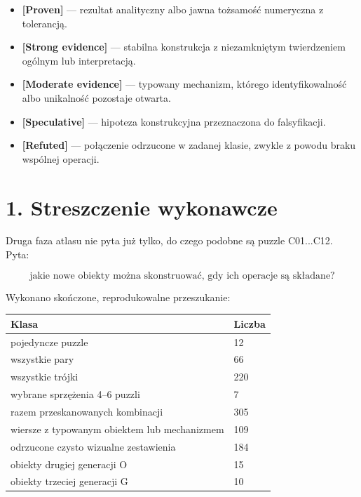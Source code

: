 \documentclass[11pt,a4paper,openany]{report}
\newcommand{\statusProven}{\textcolor{fingreen}{[Proven]}}
\newcommand{\statusStrong}{\textcolor{finblue}{[Strong evidence]}}
\newcommand{\statusModerate}{\textcolor{finviolet}{[Moderate evidence]}}
\newcommand{\statusSpeculative}{\textcolor{finorange}{[Speculative]}}
\newcommand{\statusRefuted}{\textcolor{finred}{[Refuted]}}
\begin{document}
\begin{itemize}
\item 
\textbf{\statusProven{}} --- rezultat analityczny albo jawna to\.zsamość numeryczna z tolerancją.

\item 
\textbf{\statusStrong{}} --- stabilna konstrukcja z niezamkniętym twierdzeniem ogólnym lub interpretacją.

\item 
\textbf{\statusModerate{}} --- typowany mechanizm, którego identyfikowalność albo unikalność pozostaje otwarta.

\item 
\textbf{\statusSpeculative{}} --- hipoteza konstrukcyjna przeznaczona do falsyfikacji.

\item 
\textbf{\statusRefuted{}} --- połączenie odrzucone w zadanej klasie, zwykle z powodu braku wspólnej operacji.

\end{itemize}

\chapter{1. Streszczenie wykonawcze}

Druga faza atlasu nie pyta ju\.z tylko, do czego podobne są puzzle C01...C12. Pyta:

\[
\text{jakie nowe obiekty mo\.zna skonstruować, gdy ich operacje są składane?}
\]

Wykonano skończone, reprodukowalne przeszukanie:

\begin{center}
\begingroup\small
\setlength{\tabcolsep}{2.5pt}
\renewcommand{\arraystretch}{1.16}
\begin{longtable}{@{}p{}p{}@{}}
\toprule
\textbf{Klasa} & \textbf{Liczba} \\
\midrule
\endhead
pojedyncze puzzle & 12 \\
wszystkie pary & 66 \\
wszystkie trójki & 220 \\
wybrane sprzę\.zenia 4--6 puzzli & 7 \\
razem przeskanowanych kombinacji & 305 \\
wiersze z typowanym obiektem lub mechanizmem & 109 \\
odrzucone czysto wizualne zestawienia & 184 \\
obiekty drugiej generacji O & 15 \\
obiekty trzeciej generacji G & 10 \\
\bottomrule
\end{longtable}
\endgroup
\end{center}
\end{document}
